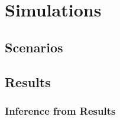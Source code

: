 
\chapter{Simulations}\label{chapter:simulations}
\section{Scenarios}
\section{Results}
\subsection{Inference from Results}